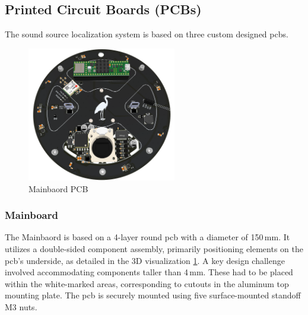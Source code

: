\newpage
\subsection{Printed Circuit Boards (PCBs)}
The sound source localization system is based on three custom designed \acrshort{pcb}s.

\begin{minipage}{\linewidth}
	\begin{figure}
		\vspace{-0.1cm}
		\includegraphics[width=6.5cm]{images/6_design_final/Mainboard_Back.png}
		\centering
		\caption{Mainbaord PCB}
		\label{fig:mainboard_pcb}
	\end{figure}
	\subsubsection{Mainboard}
	The Mainbaord is based on a 4-layer round \acrshort{pcb} with a diameter of 150\,mm.
	It utilizes a double-sided component assembly, primarily positioning elements on the \acrshort{pcb}'s underside, as detailed in the 3D visualization \ref{fig:mainboard_pcb}.
	A key design challenge involved accommodating components taller than 4\,mm.
	These had to be placed within the white-marked areas, corresponding to cutouts in the aluminum top mounting plate.
	The \acrshort{pcb} is securely mounted using five surface-mounted standoff M3 nuts.
\end{minipage}

